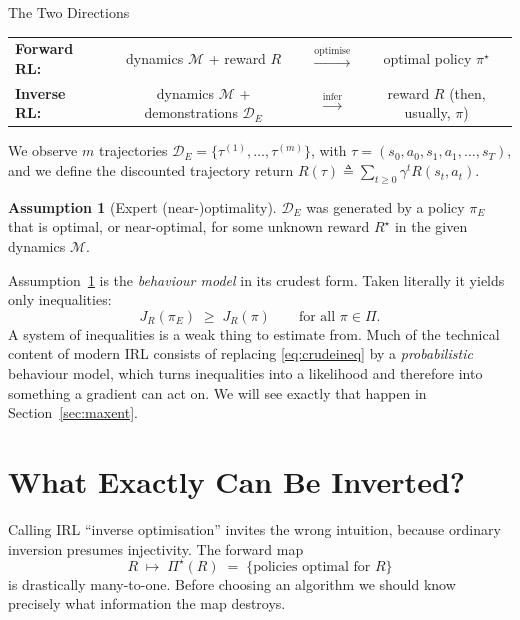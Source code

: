\documentclass[11pt]{article}
\theoremstyle{plain}
\theoremstyle{definition}
\newtheorem{assumption}[theorem]{Assumption}
\theoremstyle{remark}
\begin{document}
\begin{graybox}{The Two Directions}
\begin{center}
\begin{tabular}{@{}lccc@{}}
\textbf{Forward RL:} & dynamics $\mathcal{M}$ + reward $R$ &
$\xrightarrow{\text{optimise}}$ & optimal policy $\pi^\star$\\[4pt]
\textbf{Inverse RL:} & dynamics $\mathcal{M}$ + demonstrations $\mathcal{D}_E$ &
$\xrightarrow{\text{infer}}$ & reward $R$ (then, usually, $\pi$)
\end{tabular}
\end{center}
\end{graybox}

We observe $m$ trajectories $\mathcal{D}_E =
\{\tau^{(1)},\ldots,\tau^{(m)}\}$, with $\tau=(s_0,a_0,s_1,a_1,\ldots,s_T)$,
and we define the discounted trajectory return $R(\tau) \triangleq
\sum_{t\ge0}\gamma^t R(s_t,a_t)$.

\begin{assumption}[Expert (near-)optimality]\label{ass:expert}
$\mathcal{D}_E$ was generated by a policy $\pi_E$ that is optimal, or
near-optimal, for some unknown reward $R^\star$ in the given dynamics
$\mathcal{M}$.
\end{assumption}

Assumption~\ref{ass:expert} is the \emph{behaviour model} in its crudest
form. Taken literally it yields only inequalities:
\begin{equation}
J_R(\pi_E) \;\ge\; J_R(\pi) \qquad \text{for all } \pi\in\Pi.
\label{eq:crudeineq}
\end{equation}
A system of inequalities is a weak thing to estimate from. Much of the
technical content of modern IRL consists of replacing \eqref{eq:crudeineq}
by a \emph{probabilistic} behaviour model, which turns inequalities into a
likelihood and therefore into something a gradient can act on. We will see
exactly that happen in Section~\ref{sec:maxent}.

\section{What Exactly Can Be Inverted?}
\label{sec:invertible}

Calling IRL ``inverse optimisation'' invites the wrong intuition, because
ordinary inversion presumes injectivity. The forward map
\begin{equation}
R \;\longmapsto\; \Pi^\star(R) \;=\; \{\text{policies optimal for } R\}
\label{eq:forwardmap}
\end{equation}
is drastically many-to-one. Before choosing an algorithm we should know
precisely what information the map destroys.
\end{document}
